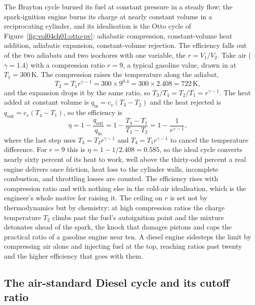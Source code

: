 The Brayton cycle burned its fuel at constant pressure in a steady flow; the
spark-ignition engine burns its charge at nearly constant volume in a reciprocating
cylinder, and its idealisation is the Otto cycle of
Figure~\ref{fig:vol04ch01:otto-pv}: adiabatic compression, constant-volume heat
addition, adiabatic expansion, constant-volume rejection. The efficiency falls out
of the two adiabats and two isochores with one variable, the  $r = V_1/V_2$. Take air ($\gamma = 1.4$) with a compression ratio $r = 9$,
a typical gasoline value, drawn in at $T_1 = 300\,\si{\kelvin}$. The compression
raises the temperature along the adiabat,
\[
T_2 = T_1 r^{\gamma - 1} = 300 \times 9^{0.4} = 300 \times 2.408 =
722\,\si{\kelvin},
\]
and the expansion drops it by the same ratio, so $T_3/T_4 = T_2/T_1 = r^{\gamma-1}$.
The heat added at constant volume is $q_{\text{in}} = c_v(T_3 - T_2)$ and the heat
rejected is $q_{\text{out}} = c_v(T_4 - T_1)$, so the efficiency is
\[
\eta = 1 - \frac{q_{\text{out}}}{q_{\text{in}}} = 1 - \frac{T_4 - T_1}{T_3 - T_2}
     = 1 - \frac{1}{r^{\gamma-1}},
\]
where the last step uses $T_3 = T_2 r^{\gamma-1}$ and $T_4 = T_1 r^{\gamma-1}$ to
cancel the temperature difference. For $r = 9$ this is $\eta = 1 - 1/2.408 = 0.585$,
so the ideal cycle converts nearly sixty percent of its heat to work, well above
the thirty-odd percent a real engine delivers once friction, heat loss to the
cylinder walls, incomplete combustion, and throttling losses are counted. The
efficiency rises with compression ratio and with nothing else in the cold-air
idealisation, which is the engineer's whole motive for raising it. The ceiling on
$r$ is set not by thermodynamics but by chemistry: at high compression ratios the
charge temperature $T_2$ climbs past the fuel's autoignition point and the mixture
detonates ahead of the spark, the knock that damages pistons and caps the practical
ratio of a gasoline engine near ten. A diesel engine sidesteps the limit by
compressing air alone and injecting fuel at the top, reaching ratios past twenty
and the higher efficiency that goes with them.



\subsection{The air-standard Diesel cycle and its cutoff ratio}

